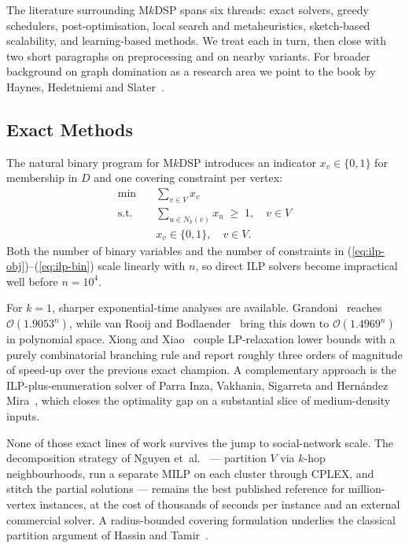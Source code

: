 \documentclass[11pt,a4paper]{article}
\begin{document}
The literature surrounding M$k$DSP spans six threads: exact solvers,
greedy schedulers, post-optimisation, local search and metaheuristics,
sketch-based scalability, and learning-based methods. We treat each in
turn, then close with two short paragraphs on preprocessing and on
nearby variants. For broader background on graph domination as a
research area we point to the book by Haynes, Hedetniemi and
Slater~\cite{haynes1998}.

\subsection{Exact Methods}

The natural binary program for M$k$DSP introduces an indicator
$x_v\in\{0,1\}$ for membership in $D$ and one covering constraint per
vertex:
\begin{align}
  \min \quad & \sum_{v\in V} x_v \label{eq:ilp-obj}\\
  \text{s.t.} \quad & \sum_{u\in N_k(v)} x_u \;\ge\; 1, \quad v\in V
    \label{eq:ilp-cover}\\
  & x_v \in \{0,1\}, \quad v\in V. \label{eq:ilp-bin}
\end{align}
Both the number of binary variables and the number of constraints in
(\ref{eq:ilp-obj})--(\ref{eq:ilp-bin}) scale linearly with $n$, so
direct ILP solvers become impractical well before
$n=10^4$.

For $k=1$, sharper exponential-time analyses are available.
Grandoni~\cite{grandoni2006} reaches $\mathcal{O}(1.9053^n)$, while
van Rooij and Bodlaender~\cite{rooij2011} bring this down to
$\mathcal{O}(1.4969^n)$ in polynomial space.
Xiong and Xiao~\cite{xiong2024} couple LP-relaxation lower bounds with
a purely combinatorial branching rule and report roughly three orders
of magnitude of speed-up over the previous exact champion.
A complementary approach is the ILP-plus-enumeration solver of
Parra Inza, Vakhania, Sigarreta and Hern{\'a}ndez
Mira~\cite{parraInza2024EJOR}, which closes the optimality gap on a
substantial slice of medium-density inputs.

None of those exact lines of work survives the jump to social-network
scale. The decomposition strategy of Nguyen et~al.~\cite{nguyen2020} ---
partition $V$ via $k$-hop neighbourhoods, run a separate MILP on each
cluster through CPLEX, and stitch the partial solutions ---
remains the best published reference for million-vertex instances, at
the cost of thousands of seconds per instance and an external
commercial solver. A radius-bounded covering formulation underlies the
classical partition argument of Hassin and Tamir~\cite{hassin1991}.
\end{document}
